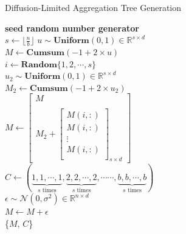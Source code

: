 \begin{algorithm}
\caption{Diffusion-Limited Aggregation Tree Generation}
\label{alg:DLA}
    \textbf{seed random number generator}\\
    $s \gets \lfloor\frac{n}{b}\rfloor$
    $u \sim \textbf{Uniform}(0,1)\in\mathbb{R}^{s \times d}$\\
    $M \gets \textbf{Cumsum}(-1 + 2 \times u)$\\
    {
         $i \gets \textbf{Random}\{1,2,\cdots, s\}$\\
         $u_2 \sim \textbf{Uniform}(0,1)\in\mathbb{R}^{s \times d}$\\
         $M_2 \gets \textbf{Cumsum}(-1 + 2 \times u_2)$\\
        $M \gets \begin{bmatrix}M \\\\
            M_2 +\left[\begin{array}{c}
                M(i, :)\\
                M(i, :)\\
                \vdots\\
                M(i, :)\\
        \end{array}\right]_{s\times d} \end{bmatrix}$\\
    }
    $C \gets (\underbrace{1,1,\cdots, 1}_{s \text{ times}}, \underbrace{2,2,\cdots, 2}_{s \text{ times}},  \cdots\cdots, \underbrace{b,b,\cdots, b}_{s \text{ times}})$\\
    $\epsilon \sim \mathcal{N}(0, \sigma^2)\in\mathbb{R}^{n\times d}$\\
    $M \gets M + \epsilon$\\
    \Return \{$M$, $C$\}\\
\end{algorithm}


